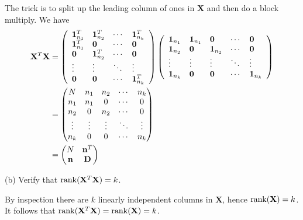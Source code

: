 \bigskip
\noindent
The trick is to split up the leading column of ones in $\mathbf X$
and then do a block multiply.
We have
\begin{align*}
\mathbf X^T\mathbf X
&=\left(\begin{array}{llll}
\mathbf 1_{n_1}^T & \mathbf 1_{n_2}^T & \cdots & \mathbf 1_{n_k}^T\\
\mathbf 1_{n_1}^T & \mathbf 0 & \cdots & \mathbf 0\\
\mathbf 0 & \mathbf 1_{n_2}^T & \cdots & \mathbf 0\\
\vdots & \vdots & \ddots & \vdots\\
\mathbf 0 & \mathbf 0 & \cdots & \mathbf 1_{n_k}^T
\end{array}\right)
\left(\begin{array}{lllll}
\mathbf 1_{n_1} & \mathbf 1_{n_1} & \mathbf 0 & \cdots & \mathbf 0\\
\mathbf 1_{n_2} & \mathbf 0 & \mathbf 1_{n_2} & \cdots & \mathbf 0\\
\vdots & \vdots & \vdots & \ddots & \vdots\\
\mathbf 1_{n_k} & \mathbf 0 & \mathbf 0 & \cdots & \mathbf 1_{n_k}
\end{array}\right)\\
&=\begin{pmatrix}
N & n_1 & n_2 & \cdots & n_k\\
n_1 & n_1 & 0 & \cdots & 0\\
n_2 & 0 & n_2 & \cdots & 0\\
\vdots & \vdots & \vdots & \ddots & \vdots\\
n_k & 0 & 0 & \cdots & n_k
\end{pmatrix}\\
&=\begin{pmatrix}
N & \mathbf n^T\cr
\mathbf n & \mathbf D
\end{pmatrix}
%
\end{align*}

\bigskip
\noindent
(b) Verify that $\mathop{\rm rank}(\mathbf X^T\mathbf X)=k$.

\bigskip
\noindent
By inspection there are $k$ linearly independent columns in $\mathbf X$, hence
$\mathop{\rm rank}(\mathbf X)=k$.
It follows that
$\mathop{\rm rank}(\mathbf X^T\mathbf X)
=\mathop{\rm rank}(\mathbf X)=k$.

